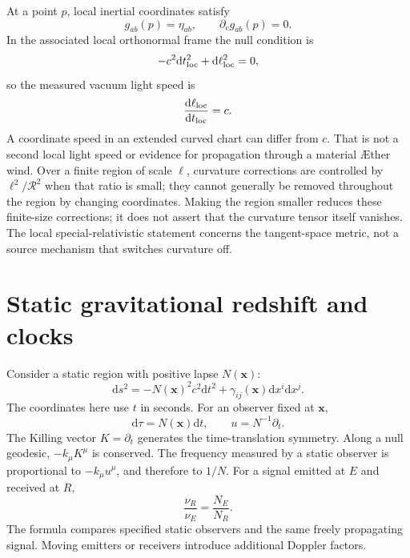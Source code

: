 \documentclass[11pt,oneside]{report}
\newcommand{\Aether}{\AE{}ther}
\newcommand{\dd}{\mathrm d}
\theoremstyle{remark}
\numberwithin{definition}{chapter}
\numberwithin{proposition}{chapter}
\numberwithin{remark}{chapter}
\begin{document}
At a point $p$, local inertial coordinates satisfy
\begin{equation}
g_{ab}(p)=\eta_{ab},\qquad \partial_cg_{ab}(p)=0.
\label{relativistic_recovery:eq:localinertial}
\end{equation}
In the associated local orthonormal frame the null condition is
\begin{equation}
-c^2\dd t_{\rm loc}^2+\dd\ell_{\rm loc}^2=0,
\label{relativistic_recovery:eq:localminkowski}
\end{equation}
so the measured vacuum light speed is
\begin{equation}
\frac{\dd\ell_{\rm loc}}{\dd t_{\rm loc}}=c.
\label{relativistic_recovery:eq:localc}
\end{equation}
A coordinate speed in an extended curved chart can differ from $c$. That is not a second local light speed or evidence for propagation through a material \Aether{} wind. Over a finite region of scale $\ell$, curvature corrections are controlled by $\ell^2/\mathcal R^2$ when that ratio is small; they cannot generally be removed throughout the region by changing coordinates. Making the region smaller reduces these finite-size corrections; it does not assert that the curvature tensor itself vanishes. The local special-relativistic statement concerns the tangent-space metric, not a source mechanism that switches curvature off.

\section{Static gravitational redshift and clocks}
Consider a static region with positive lapse $N(\mathbf x)$:
\begin{equation}
\dd s^2=-N(\mathbf x)^2c^2\dd t^2+\gamma_{ij}(\mathbf x)\dd x^i\dd x^j.
\label{relativistic_recovery:eq:staticmetric}
\end{equation}
The coordinates here use $t$ in seconds. For an observer fixed at $\mathbf x$,
\begin{equation}
\dd\tau=N(\mathbf x)\dd t,\qquad u=N^{-1}\partial_t.
\label{relativistic_recovery:eq:stationaryclock}
\end{equation}
The Killing vector $K=\partial_t$ generates the time-translation symmetry. Along a null geodesic, $-k_\mu K^\mu$ is conserved. The frequency measured by a static observer is proportional to $-k_\mu u^\mu$, and therefore to $1/N$. For a signal emitted at $E$ and received at $R$,
\begin{equation}
\frac{\nu_R}{\nu_E}=\frac{N_E}{N_R}.
\label{relativistic_recovery:eq:redshift}
\end{equation}
The formula compares specified static observers and the same freely propagating signal. Moving emitters or receivers introduce additional Doppler factors.
\end{document}
